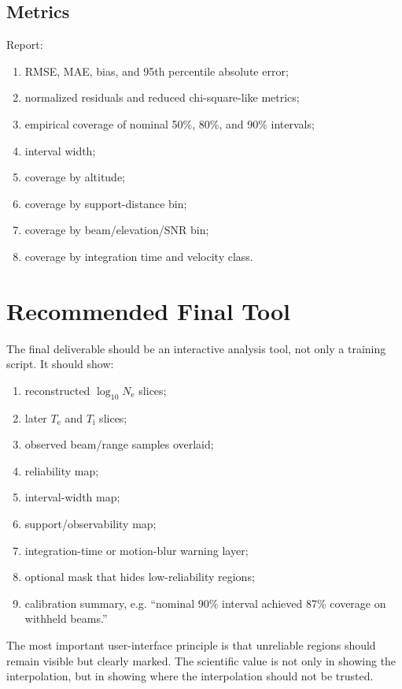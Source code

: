 \documentclass[11pt]{article}
\newcommand{\Ne}{N_{\mathrm e}}
\newcommand{\Te}{T_{\mathrm e}}
\newcommand{\Ti}{T_{\mathrm i}}
\begin{document}
\subsection{Metrics}

Report:
\begin{enumerate}[leftmargin=*]
  \item RMSE, MAE, bias, and 95th percentile absolute error;
  \item normalized residuals and reduced chi-square-like metrics;
  \item empirical coverage of nominal 50\%, 80\%, and 90\% intervals;
  \item interval width;
  \item coverage by altitude;
  \item coverage by support-distance bin;
  \item coverage by beam/elevation/SNR bin;
  \item coverage by integration time and velocity class.
\end{enumerate}

\section{Recommended Final Tool}

The final deliverable should be an interactive analysis tool, not only a training script. It should
show:
\begin{enumerate}[leftmargin=*]
  \item reconstructed $\log_{10}\Ne$ slices;
  \item later $\Te$ and $\Ti$ slices;
  \item observed beam/range samples overlaid;
  \item reliability map;
  \item interval-width map;
  \item support/observability map;
  \item integration-time or motion-blur warning layer;
  \item optional mask that hides low-reliability regions;
  \item calibration summary, e.g. ``nominal 90\% interval achieved 87\% coverage on withheld
  beams.''
\end{enumerate}

The most important user-interface principle is that unreliable regions should remain visible but
clearly marked. The scientific value is not only in showing the interpolation, but in showing where
the interpolation should not be trusted.
\end{document}
